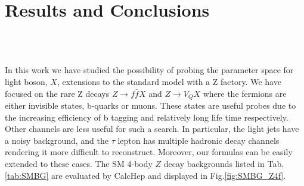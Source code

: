 \documentclass[11pt]{article}
\begin{document}
\section{Results and Conclusions}\label{sec:conclusions}
 \begin{figure*}[htb!]
 \centering
  \quad
   \\
    \quad
  \\
 \quad
\caption{  (a,c,e) The $3 \sigma$  limits on $\sqrt{\xi}\st^2\times Br(S\to f\bar{f})$ v.s. $M_S$ with $10^{12}$ $Z$'s. (b,d,f) The $3 \sigma$  limits on $\sqrt{\xi}(g_D^f)^2\times Br(V_D\to f'\bar{f'})$ v.s. $M_{V_D}$ with $10^{12}$ $Z$'s and energy resolution $\triangle E=1$GeV.
Here $\xi$ denotes the unknown total detection efficiencies for the signals.
In (a), we also display the limits from the direct search at LEP2\cite{Barate:2003sz}(where the detection efficiencies have been taken into account), $pp\ra t\bar{t}S(b\bar{b})$ at HLC13 and HLC100 with ${\cal L}=3 ab^{-1}$, and at the Higgs factory\cite{Chang:2017ynj} with ${\cal L}=1 ab^{-1}$. In (f), some limits adopted from the Drell-Yan process at LHC\cite{Curtin:2014cca} and $e^+e^-\ra \gamma \mu\bar{\mu}$ at the CEPC and FCC\cite{He:2017zzr} are displayed. Note however these limits apply to the kinetic $U(1)_Y\mhyphen U(1)_{\mbox{hidden}}$ mixing model only.   }
\label{fig:limit_Xff}
 \end{figure*}
In this work we have studied the possibility of probing the parameter space for light boson, $X$, extensions to the standard model with a Z factory. We have focused on the rare Z decays  $Z \to f \bar{f} X$ and $Z \to V_Q X$ where the fermions are either invisible states, b-quarks or muons. These states are useful probes due to  the increasing efficiency of b tagging and relatively long life time respectively.
Other channels are less useful for such a search. In particular, the light jets have a noisy background, and the $\tau$ lepton has multiple hadronic decay channels rendering it more difficult to reconstruct. Moreover, our formulas  can be easily extended to these cases.
The SM 4-body $Z$ decay backgrounds listed in Tab.\ref{tab:SMBG} are evaluated by CalcHep and displayed in Fig.\ref{fig:SMBG_Z4f}.
 \begin{figure*}[htb!]
 \centering
  \quad
 \quad
\caption{(a) The SM background decay branching  vs $M_X$.
    The solid/dash line is for the $X$ invisible/visible decay associated with $f=\mu, b$.
    (b) The SM background decay branching for visible decay associated with $\mu$ or $b$ vs $M_X$. }
\label{fig:SMBG_Z4f}
 \end{figure*}
\end{document}
